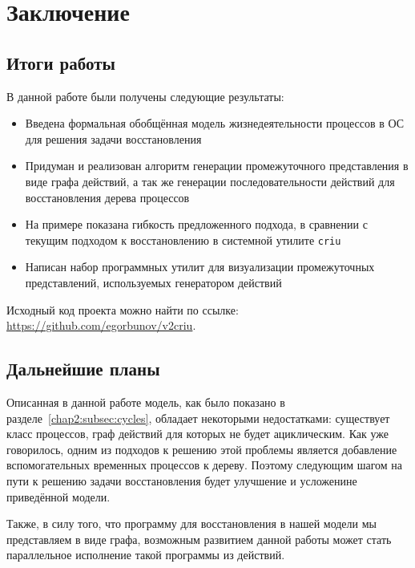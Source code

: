

\chapter{Заключение}

\section{Итоги работы}

В данной работе были получены следующие результаты:

\begin{itemize}
	\item Введена формальная обобщённая модель жизнедеятельности процессов в ОС для решения задачи восстановления
	\item Придуман и реализован алгоритм генерации промежуточного представления в виде графа действий, а так
	же генерации последовательности действий для восстановления дерева процессов
	\item На примере показана гибкость предложенного подхода, в сравнении с текущим подходом к восстановлению в системной утилите \texttt{criu}
	\item Написан набор программных утилит для визуализации промежуточных представлений, используемых генератором действий
\end{itemize}

Исходный код проекта можно найти по ссылке: \url{https://github.com/egorbunov/v2criu}.

\section{Дальнейшие планы}

Описанная в данной работе модель, как было показано в разделе~\ref{chap2:subsec:cycles}, обладает некоторыми недостатками: существует класс процессов, граф действий для которых не будет ациклическим. Как уже говорилось, одним из подходов к решению
этой проблемы является добавление вспомогательных временных процессов к дереву. Поэтому следующим шагом на пути к решению
задачи восстановления будет улучшение и усложенине приведённой модели.

Также, в силу того, что программу для восстановления в нашей модели мы представляем в виде графа, возможным развитием данной работы может стать параллельное исполнение такой программы из действий.
